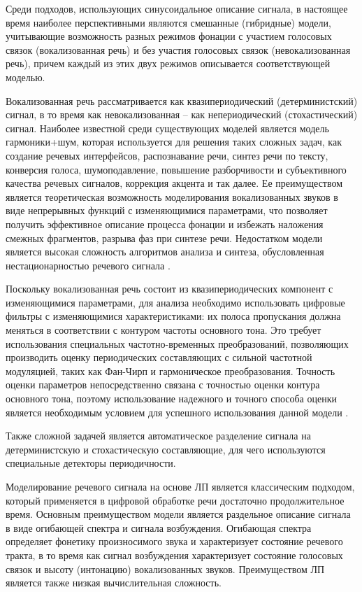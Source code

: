 Среди подходов, использующих синусоидальное описание сигнала, в настоящее время наиболее перспективными являются смешанные (гибридные) модели, учитывающие возможность разных режимов фонации с участием голосовых связок (вокализованная речь) и без участия голосовых связок (невокализованная речь), причем каждый из этих двух режимов описывается соответствующей моделью. 

Вокализованная речь рассматривается как квазипериодический (детерминистский) сигнал, в то время как невокализованная – как непериодический (стохастический) сигнал. Наиболее известной среди существующих моделей является модель гармоники+шум, которая используется для решения таких сложных задач, как создание речевых интерфейсов, распознавание речи, синтез речи по тексту, конверсия голоса, шумоподавление, повышение разборчивости и субъективного качества речевых сигналов, коррекция акцента и так далее. Ее преимуществом является теоретическая возможность моделирования вокализованных звуков в виде непрерывных функций с изменяющимися параметрами, что позволяет получить эффективное описание процесса фонации и избежать наложения смежных фрагментов, разрыва фаз при синтезе речи. Недостатком модели является высокая сложность алгоритмов анализа и синтеза, обусловленная нестационарностью речевого сигнала . 

Поскольку вокализованная речь состоит из квазипериодических компонент с изменяющимися параметрами, для анализа необходимо использовать цифровые фильтры с изменяющимися характеристиками: их полоса пропускания должна меняться в соответствии с контуром частоты основного тона. Это требует использования специальных частотно-временных преобразований, позволяющих производить оценку периодических составляющих с сильной частотной модуляцией, таких как Фан-Чирп и гармоническое преобразования. Точность оценки параметров непосредственно связана с точностью оценки контура основного тона, поэтому использование надежного и точного способа оценки является необходимым условием для успешного использования данной модели . 

Также сложной задачей является автоматическое разделение сигнала на детерминистскую и стохастическую составляющие, для чего используются специальные детекторы периодичности.

Моделирование речевого сигнала на основе ЛП является классическим подходом, который применяется в цифровой обработке речи достаточно продолжительное время. Основным преимуществом модели является раздельное описание сигнала в виде огибающей спектра и сигнала возбуждения. Огибающая спектра определяет фонетику произносимого звука и характеризует состояние речевого тракта, в то время как сигнал возбуждения характеризует состояние голосовых связок и высоту (интонацию) вокализованных звуков. Преимуществом ЛП является также низкая вычислительная сложность. 


